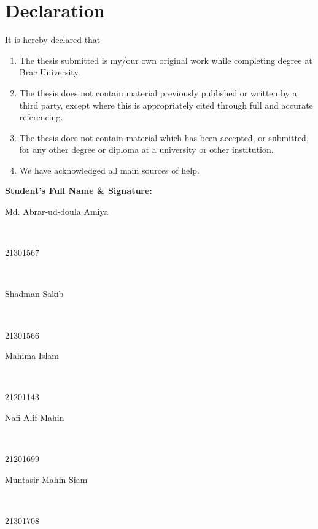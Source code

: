\newcommand*\wildcard[2][6cm]{\vspace{2cm}\parbox{#1}{\hrulefill\par#2}} 


\section*{Declaration}

It is hereby declared that

\begin{enumerate} %
  \item The thesis submitted is my/our own original work while completing degree at Brac University.
  \item The thesis does not contain material previously published or written by a third party, except where this is appropriately cited through full and accurate referencing.
  \item The thesis does not contain material which has been accepted, or submitted, for any other degree or diploma at a university or other institution.
  \item We have acknowledged all main sources of help.
\end{enumerate}

\vspace{1cm}
\textbf{Student’s Full Name \& Signature:} %

\begingroup

    \begin{center}
        \wildcard{\centerline{Md. Abrar-ud-doula Amiya} ~\\ \centerline{21301567}} %
        \hspace{2cm}
        \ %
        \wildcard{\centerline{Shadman Sakib} ~\\ \centerline{21301566} }
        \wildcard{\centerline{Mahima Islam} ~\\ \centerline{21201143} }
        \hspace{2cm}
        \wildcard{\centerline{Nafi Alif Mahin} ~\\ \centerline{21201699} }
        \hspace{1.5cm}
        \wildcard{\centerline{Muntasir Mahin Siam} ~\\ \centerline{21301708} }
    \end{center}

\endgroup


\pagebreak





